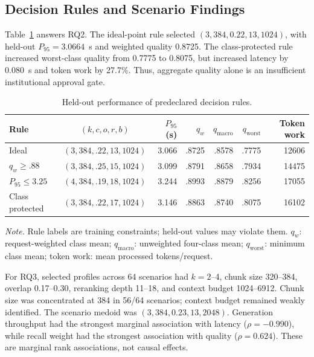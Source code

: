 \documentclass[runningheads]{llncs}
\begin{document}
\subsection{Decision Rules and Scenario Findings}

Table~\ref{tab:decisions} answers RQ2. The ideal-point rule selected $(3,384,0.22,13,1024)$, with held-out $P_{95}=3.0664$~s and weighted quality 0.8725. The class-protected rule increased worst-class quality from 0.7775 to 0.8075, but increased latency by 0.080~s and token work by 27.7\%. Thus, aggregate quality alone is an insufficient institutional approval gate.

\begin{table}[t]
\caption{Held-out performance of predeclared decision rules.}
\label{tab:decisions}
\centering
\scriptsize
\setlength{\tabcolsep}{1.9pt}
\begin{tabular}{@{}lcrrrrr@{}}
\toprule
Rule & $(k,c,o,r,b)$ & $P_{95}$ (s) & $q_w$ & $q_{\mathrm{macro}}$ & $q_{\mathrm{worst}}$ & Token work \\
\midrule
Ideal & $(3,384,.22,13,1024)$ & 3.066 & .8725 & .8578 & .7775 & 12606 \\
$q_w\geq.88$ & $(3,384,.25,15,1024)$ & 3.099 & .8791 & .8658 & .7934 & 14475 \\
$P_{95}\leq3.25$ & $(4,384,.19,18,1024)$ & 3.244 & .8993 & .8879 & .8256 & 17055 \\
Class protected & $(3,384,.22,17,1024)$ & 3.146 & .8863 & .8740 & .8075 & 16102 \\
\bottomrule
\end{tabular}
\par\vspace{2pt}
{\scriptsize\emph{Note.} Rule labels are training constraints; held-out values may violate them.
$q_w$: request-weighted class mean; $q_{\mathrm{macro}}$: unweighted four-class mean;
$q_{\mathrm{worst}}$: minimum class mean; token work: mean processed tokens/request.}
\end{table}

For RQ3, selected profiles across 64 scenarios had $k=2$--4, chunk size 320--384, overlap 0.17--0.30, reranking depth 11--18, and context budget 1024--6912. Chunk size was concentrated at 384 in 56/64 scenarios; context budget remained weakly identified. The scenario medoid was $(3,384,0.23,13,2048)$. Generation throughput had the strongest marginal association with latency ($\rho=-0.990$), while recall weight had the strongest association with quality ($\rho=0.624$). These are marginal rank associations, not causal effects.
\end{document}

